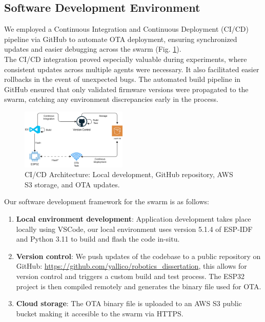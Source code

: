 \documentclass[conference]{IEEEtran}
\begin{document}
\subsection{Software Development Environment}\label{sec:SDK}

We employed a Continuous Integration and Continuous Deployment (CI/CD) pipeline via GitHub to automate OTA deployment, ensuring synchronized updates and easier debugging across the swarm (Fig. \ref{fig:cicd-architecture}).\\

The CI/CD integration proved especially valuable during experiments, where consistent updates across multiple agents were necessary. It also facilitated easier rollbacks in the event of unexpected bugs. The automated build pipeline in GitHub ensured that only validated firmware versions were propagated to the swarm, catching any environment discrepancies early in the process.\\

\begin{figure}[h]
    \centering
    \includegraphics[width=0.45\textwidth]{architecture.png}
    \caption{CI/CD Architecture: Local development, GitHub repository, AWS S3 storage, and OTA updates.}
    \label{fig:cicd-architecture}
\end{figure}

Our software development framework for the swarm is as follows:

\begin{enumerate}
    \item \textbf{Local environment development}: Application development takes place locally using VSCode, our local environment uses version 5.1.4 of ESP-IDF and Python 3.11 to build and flash the code in-situ.\\
    \item \textbf{Version control}: We push updates of the codebase to a public repository on GitHub: \url{https://github.com/yallico/robotics_dissertation}, this allows for version control and triggers a custom build and test process. The ESP32 project is then compiled remotely and generates the binary file used for OTA.\\
    \item \textbf{Cloud storage}: The OTA binary file is uploaded to an AWS S3 public bucket making it accesible to the swarm via HTTPS.\\
\end{enumerate}
\end{document}
